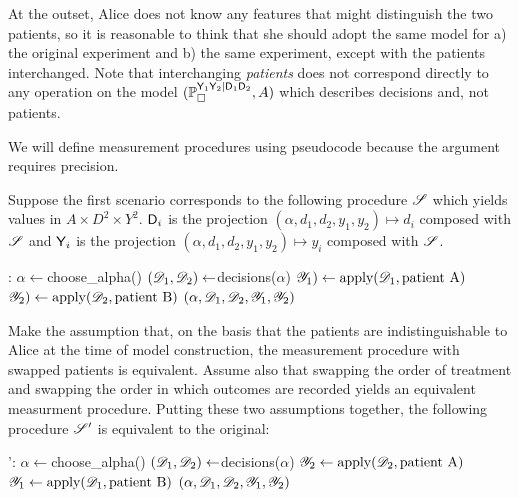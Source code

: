 At the outset, Alice does not know any features that might distinguish the two patients, so it is reasonable to think that she should adopt the same model for a) the original experiment and b) the same experiment, except with the patients interchanged. Note that interchanging \emph{patients} does not correspond directly to any operation on the model $(\mathbb{P}_\square^{\mathsf{Y}_1\mathsf{Y}_2|\mathsf{D}_1\mathsf{D}_2},A)$ which describes decisions and, not patients.

We will define measurement procedures using pseudocode because the argument requires precision.

Suppose the first scenario corresponds to the following procedure $\mathscr{S}$ which yields values in $A\times D^2\times Y^2$. $\mathsf{D}_i$ is the projection $(\alpha,d_1,d_2,y_1,y_2)\mapsto d_i$ composed with $\mathscr{S}$ and $\mathsf{Y}_i$ is the projection $(\alpha,d_1,d_2,y_1,y_2)\mapsto y_i$ composed with $\mathscr{S}$.


\begin{algorithmic}
    :
        \State $\alpha \gets $choose_alpha()
        \State $(\mathscr{D}_1,\mathscr{D}_2) \gets $decisions($\alpha$)
        \State $\mathscr{Y}_1)\gets \text{apply}(\mathscr{D}_1,\text{patient A})$
        \State $\mathscr{Y}_2)\gets \text{apply}(\mathscr{D}_2,\text{patient B})$
    \Return $(\alpha,\mathscr{D}_1,\mathscr{D}_2,\mathscr{Y}_1,\mathscr{Y}_2)$
\end{algorithmic}

Make the assumption that, on the basis that the patients are indistinguishable to Alice at the time of model construction, the measurement procedure with swapped patients is equivalent. Assume also that swapping the order of treatment and swapping the order in which outcomes are recorded yields an equivalent measurment procedure. Putting these two assumptions together, the following procedure $\mathscr{S}'$ is equivalent to the original:

\begin{algorithmic}
    ':
        \State $\alpha \gets $choose_alpha()
        \State $(\mathscr{D}_1,\mathscr{D}_2) \gets $decisions($\alpha$)
        \State $\mathscr{Y}_2\gets \text{apply}(\mathscr{D}_2,\text{patient A})$
        \State $\mathscr{Y}_1\gets \text{apply}(\mathscr{D}_1,\text{patient B})$
    \Return $(\alpha,\mathscr{D}_1,\mathscr{D}_2,\mathscr{Y}_1,\mathscr{Y}_2)$
\end{algorithmic}

